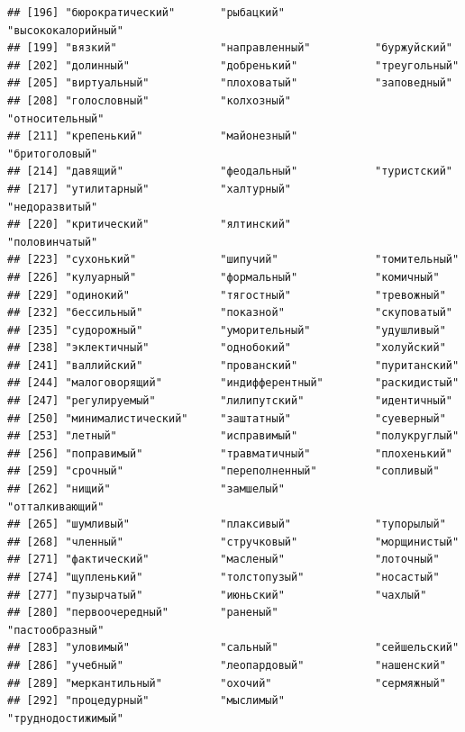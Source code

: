 \documentclass[11pt]{article}\usepackage[]{graphicx}\usepackage[]{color}
\makeatletter
\newenvironment{kframe}{%
 \def\at@end@of@kframe{}%
 \ifinner\ifhmode%
  \def\at@end@of@kframe{\end{minipage}}%
  \begin{minipage}{\columnwidth}%
 \fi\fi%
 \def\FrameCommand##1{\hskip\@totalleftmargin \hskip-\fboxsep
 \colorbox{shadecolor}{##1}\hskip-\fboxsep
     \hskip-\linewidth \hskip-\@totalleftmargin \hskip\columnwidth}%
 \MakeFramed {\advance\hsize-\width
   \@totalleftmargin\z@ \linewidth\hsize
   \@setminipage}}%
 {\par\unskip\endMakeFramed%
 \at@end@of@kframe}
\newenvironment{knitrout}{}{} %
\makeatother
\begin{document}
\begin{knitrout}
\begin{kframe}
\begin{verbatim}
## [196] "бюрократический"       "рыбацкий"              "высококалорийный"     
## [199] "вязкий"                "направленный"          "буржуйский"           
## [202] "долинный"              "добренький"            "треугольный"          
## [205] "виртуальный"           "плоховатый"            "заповедный"           
## [208] "голословный"           "колхозный"             "относительный"        
## [211] "крепенький"            "майонезный"            "бритоголовый"         
## [214] "давящий"               "феодальный"            "туристский"           
## [217] "утилитарный"           "халтурный"             "недоразвитый"         
## [220] "критический"           "ялтинский"             "половинчатый"         
## [223] "сухонький"             "шипучий"               "томительный"          
## [226] "кулуарный"             "формальный"            "комичный"             
## [229] "одинокий"              "тягостный"             "тревожный"            
## [232] "бессильный"            "показной"              "скуповатый"           
## [235] "судорожный"            "уморительный"          "удушливый"            
## [238] "эклектичный"           "однобокий"             "холуйский"            
## [241] "валлийский"            "прованский"            "пуританский"          
## [244] "малоговорящий"         "индифферентный"        "раскидистый"          
## [247] "регулируемый"          "лилипутский"           "идентичный"           
## [250] "минималистический"     "заштатный"             "суеверный"            
## [253] "летный"                "исправимый"            "полукруглый"          
## [256] "поправимый"            "травматичный"          "плохенький"           
## [259] "срочный"               "переполненный"         "сопливый"             
## [262] "нищий"                 "замшелый"              "отталкивающий"        
## [265] "шумливый"              "плаксивый"             "тупорылый"            
## [268] "членный"               "стручковый"            "морщинистый"          
## [271] "фактический"           "масленый"              "лоточный"             
## [274] "щупленький"            "толстопузый"           "носастый"             
## [277] "пузырчатый"            "июньский"              "чахлый"               
## [280] "первоочередный"        "раненый"               "пастообразный"        
## [283] "уловимый"              "сальный"               "сейшельский"          
## [286] "учебный"               "леопардовый"           "нашенский"            
## [289] "меркантильный"         "охочий"                "сермяжный"            
## [292] "процедурный"           "мыслимый"              "труднодостижимый"     

\end{verbatim}
\end{kframe}
\end{knitrout}
\end{document}
